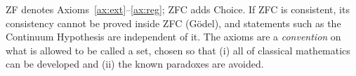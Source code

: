 \begin{remark}
	ZF denotes Axioms~\ref{ax:ext}--\ref{ax:reg}; ZFC adds Choice. If ZFC is consistent, its consistency cannot be proved inside ZFC (G\"odel), and statements such as the Continuum Hypothesis are independent of it. The axioms are a \emph{convention} on what is allowed to be called a set, chosen so that (i) all of classical mathematics can be developed and (ii) the known paradoxes are avoided.
\end{remark}